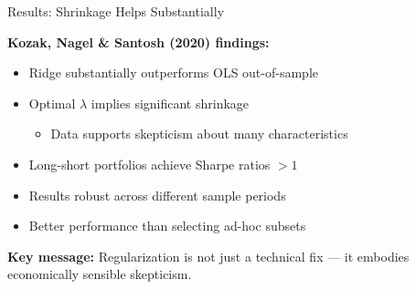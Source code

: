 \documentclass[10pt]{beamer}
\begin{document}
\begin{frame}{Results: Shrinkage Helps Substantially}

\textbf{Kozak, Nagel \& Santosh (2020) findings:}

\vspace{1em}
\begin{itemize}
  \item Ridge substantially outperforms OLS out-of-sample
  
  \vspace{0.5em}
  \item Optimal $\lambda$ implies significant shrinkage
  \begin{itemize}
    \item Data supports skepticism about many characteristics
  \end{itemize}
  
  \vspace{0.5em}
  \item Long-short portfolios achieve Sharpe ratios $> 1$
  
  \vspace{0.5em}
  \item Results robust across different sample periods
  
  \vspace{0.5em}
  \item Better performance than selecting ad-hoc subsets
\end{itemize}

\vspace{1em}
\textbf{Key message:} Regularization is not just a technical fix --- it embodies economically sensible skepticism.

\end{frame}
\end{document}
